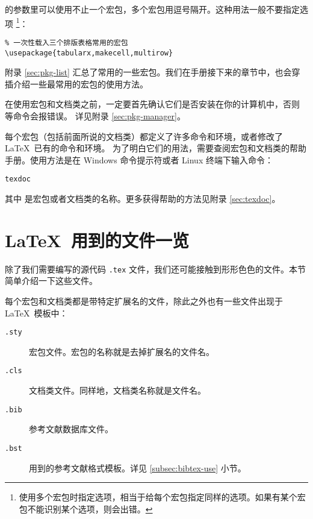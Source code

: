 的参数里可以使用不止一个宏包，多个宏包用逗号隔开。这种用法一般不要指定选项%
\footnote{使用多个宏包时指定选项，相当于给每个宏包指定同样的选项。如果有某个宏包不能识别某个选项，则会出错。}：
\begin{verbatim}
% 一次性载入三个排版表格常用的宏包
\usepackage{tabularx,makecell,multirow}
\end{verbatim}

附录 \ref{sec:pkg-list} 汇总了常用的一些宏包。我们在手册接下来的章节中，也会穿插介绍一些最常用的宏包的使用方法。

在使用宏包和文档类之前，一定要首先确认它们是否安装在你的计算机中，否则  等命令会报错误。
详见附录 \ref{sec:pkg-manager}。

每个宏包（包括前面所说的文档类）都定义了许多命令和环境，或者修改了 \LaTeX\ 已有的命令和环境。
为了明白它们的用法，需要查阅宏包和文档类的帮助手册。使用方法是在 Windows 命令提示符或者 Linux 终端下输入命令：
\begin{command}
\texttt{texdoc} 
\end{command}

其中  是宏包或者文档类的名称。更多获得帮助的方法见附录 \ref{sec:texdoc}。

\section{\LaTeX\ 用到的文件一览}\label{sec:latex-files}

除了我们需要编写的源代码 \texttt{.tex} 文件，我们还可能接触到形形色色的文件。本节简单介绍一下这些文件。

每个宏包和文档类都是带特定扩展名的文件，除此之外也有一些文件出现于 \LaTeX\ 模板中：
\begin{description}
  \item[\texttt{.sty}] 宏包文件。宏包的名称就是去掉扩展名的文件名。
  \item[\texttt{.cls}] 文档类文件。同样地，文档类名称就是文件名。
  \item[\texttt{.bib}]  参考文献数据库文件。
  \item[\texttt{.bst}]  用到的参考文献格式模板。详见 \ref{subsec:bibtex-use} 小节。
\end{description}

